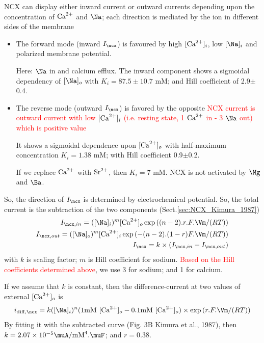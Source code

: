 NCX can display either inward current or outward currents depending upon the
concentration of ${\text{Ca}^{2+}}$ and $\Na$; each direction is mediated by the ion in
different sides of the membrane

\begin{itemize}

\item The forward mode (inward $I_\ncx$) is favoured by high $[{\text{Ca}^{2+}}]_i$, low
$[\Na]_i$ and polarized membrane potential.

Here: $\Na$ in and calcium efflux. The inward component shows a sigmoidal
dependency of $[\Na]_o$ with $K_i = 87.5\pm 10.7$ mM; and Hill coefficient of
2.9$\pm$0.4. 

\item The reverse mode (outward $I_\ncx$) is favored by the opposite
\textcolor{red}{NCX current is outward current with low $[{\text{Ca}^{2+}}]_i$ (i.e. resting
state, 1 ${\text{Ca}^{2+}}$ in - 3 $\Na$ out) which is positive value}

It shows a sigmoidal dependence upon $[{\text{Ca}^{2+}}]_o$ with half-maximum concentration
$K_i = 1.38$ mM; with Hill coefficient 0.9$\pm$0.2.

If we replace ${\text{Ca}^{2+}}$ with $\ce{Sr^2+}$, then $K_i=7$ mM. NCX is not activated by
$\Mg$ and $\Ba$. 

\end{itemize}


So, the direction of $I_\ncx$ is determined by electrochemical
potential.  So, the total current is the subtraction of the two components
(Sect.\ref{sec:NCX_Kimura_1987})
\begin{equation}
\begin{split}
I_{\ncx,in} = ([\Na]_i)^m [\Ca]_o \exp\left( (n-2) . r . F.\Vm/(RT) \right) \\
I_{\ncx,out} = ([\Na]_o)^m [\Ca]_i \exp\left( -(n-2).(1-r) F.\Vm/(RT) \right) \\
I_{\ncx} = k \times (I_{\ncx,in} - I_{\ncx,out})
\end{split}
\end{equation}
with $k$ is scaling factor; $m$ is Hill coefficient for sodium.
\textcolor{red}{Based on the Hill coefficients determined above}, we use 3 for
sodium; and 1 for calcium.

If we assume that $k$ is constant, then the difference-current at two values of
external $[{\text{Ca}^{2+}}]_o$ is
\begin{equation}
i_{\text{diff},\ncx} = k ([\Na]_i)^n (\text{1mM $[\Ca]_o$} - \text{0.1mM
$[\Ca]_o$}) \times \exp\left( r.F.\Vm/(RT)\right)
\end{equation}
By fitting it with the subtracted curve (Fig. 3B Kimura et al., 1987), then 
$k = 2.07 \times 10^{-5} \muA/\text{mM}^4.\muF$; and $r=0.38$.



